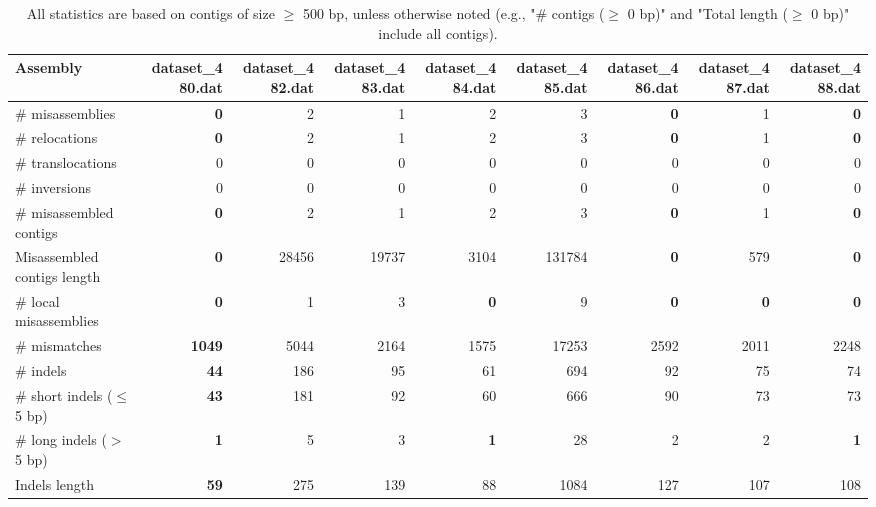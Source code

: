 \documentclass[12pt,a4paper]{article}
\begin{document}
\begin{table}[ht]
\begin{center}
\caption{All statistics are based on contigs of size $\geq$ 500 bp, unless otherwise noted (e.g., "\# contigs ($\geq$ 0 bp)" and "Total length ($\geq$ 0 bp)" include all contigs).}
\begin{tabular}{|l*{8}{|r}|}
\hline
Assembly & dataset\_480.dat & dataset\_482.dat & dataset\_483.dat & dataset\_484.dat & dataset\_485.dat & dataset\_486.dat & dataset\_487.dat & dataset\_488.dat \\ \hline
\# misassemblies & {\bf 0} & 2 & 1 & 2 & 3 & {\bf 0} & 1 & {\bf 0} \\ \hline
\hspace{5mm}\# relocations & {\bf 0} & 2 & 1 & 2 & 3 & {\bf 0} & 1 & {\bf 0} \\ \hline
\hspace{5mm}\# translocations & 0 & 0 & 0 & 0 & 0 & 0 & 0 & 0 \\ \hline
\hspace{5mm}\# inversions & 0 & 0 & 0 & 0 & 0 & 0 & 0 & 0 \\ \hline
\# misassembled contigs & {\bf 0} & 2 & 1 & 2 & 3 & {\bf 0} & 1 & {\bf 0} \\ \hline
Misassembled contigs length & {\bf 0} & 28456 & 19737 & 3104 & 131784 & {\bf 0} & 579 & {\bf 0} \\ \hline
\# local misassemblies & {\bf 0} & 1 & 3 & {\bf 0} & 9 & {\bf 0} & {\bf 0} & {\bf 0} \\ \hline
\# mismatches & {\bf 1049} & 5044 & 2164 & 1575 & 17253 & 2592 & 2011 & 2248 \\ \hline
\# indels & {\bf 44} & 186 & 95 & 61 & 694 & 92 & 75 & 74 \\ \hline
\hspace{5mm}\# short indels ($\leq$ 5 bp) & {\bf 43} & 181 & 92 & 60 & 666 & 90 & 73 & 73 \\ \hline
\hspace{5mm}\# long indels ($>$ 5 bp) & {\bf 1} & 5 & 3 & {\bf 1} & 28 & 2 & 2 & {\bf 1} \\ \hline
Indels length & {\bf 59} & 275 & 139 & 88 & 1084 & 127 & 107 & 108 \\ \hline
\end{tabular}
\end{center}
\end{table}
\end{document}
